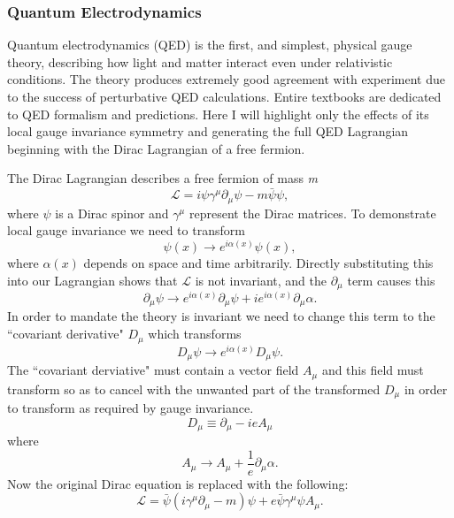 \subsubsection{Quantum Electrodynamics}
Quantum electrodynamics (QED) is the first, and simplest, physical gauge theory, describing how light and matter interact even under relativistic conditions. The theory produces extremely good agreement with experiment due to the success of perturbative QED calculations. Entire textbooks are dedicated to QED formalism and predictions. Here I will highlight only the effects of its local gauge invariance symmetry and generating the full QED Lagrangian beginning with the Dirac Lagrangian of a free fermion. 

The Dirac Lagrangian describes a free fermion of mass \textit{m}
\begin{equation}
\mathcal{L} = i \psi \gamma^\mu \partial_ \mu \psi - m\bar{\psi}\psi,
\end{equation}
where $\psi$ is a Dirac spinor and $\gamma^\mu$ represent the Dirac matrices. To demonstrate local gauge invariance we need to transform
\begin{equation}
\psi(x) \rightarrow e^{i\alpha(x)}\psi(x), 
\end{equation}
where $\alpha(x)$ depends on space and time arbitrarily. Directly substituting this into our Lagrangian shows that $\mathcal{L}$ is not invariant, and the $\partial_\mu$ term causes this
\begin{equation}
\partial_\mu \psi \rightarrow e^{i\alpha(x)}\partial_\mu\psi + ie^{i\alpha(x)}\partial_\mu \alpha.
\end{equation}
In order to mandate the theory is invariant we need to change this term to the ``covariant derivative" $D_\mu$ which transforms 
\begin{equation}
D_\mu\psi \rightarrow e^{i\alpha(x)}D_\mu\psi. 
\end{equation}	 
The ``covariant derviative" must contain a vector field $A_\mu$ and this field must transform so as to cancel with the unwanted part of the transformed $D_\mu$ in order to transform as required by gauge invariance. 
\begin{equation}
D_\mu \equiv \partial_\mu - ieA_\mu
\end{equation}
where 
\begin{equation}
A_\mu \rightarrow A_\mu + \frac{1}{e}\partial_\mu \alpha.
\end{equation}
Now the original Dirac equation is replaced with the following:
\begin{equation}
\mathcal{L} = \bar{\psi}(i\gamma^\mu\partial_\mu-m)\psi + e\bar{\psi}\gamma^\mu\psi A_\mu.
\end{equation}
